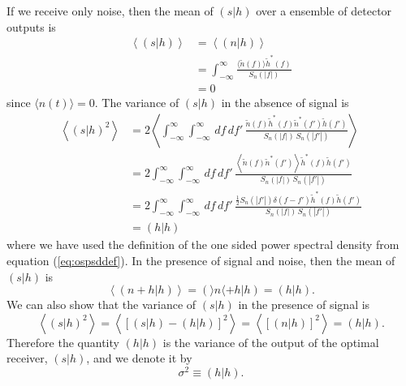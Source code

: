 If we receive only noise, then the mean of $(s|h)$ over a ensemble of detector
outputs is 
\begin{equation}
\begin{split}
\left\langle (s|h) \right\rangle &= \left\langle (n|h) \right\rangle \\
&= \int_{-\infty}^{\infty} 
   \frac{\langle\tilde{n}(f)\rangle \tilde{h}^\ast(f)}{S_n(|f|)} \\
&= 0
\end{split}
\end{equation}
since $\langle n(t) \rangle = 0$. The variance of $(s|h)$ in the absence of
signal is
\begin{equation}
\begin{split}
\left\langle(s|h)^2\right\rangle 
&= 2 \left\langle \int_{-\infty}^\infty \int_{-\infty}^\infty \,df\,df'\,
\frac{\tilde{n}(f)\tilde{h}^\ast(f) \tilde{n}^\ast(f')\tilde{h}(f')}
{S_n(|f|)\,S_n(|f'|)} \right\rangle \\
&= 2 \int_{-\infty}^\infty \int_{-\infty}^\infty \,df\,df'\,
\frac{\left\langle \tilde{n}(f)\tilde{n}^\ast(f')\right\rangle\tilde{h}^\ast(f)\tilde{h}(f')}
{S_n(|f|)\,S_n(|f'|)} \\
&= 2 \int_{-\infty}^\infty \int_{-\infty}^\infty \,df\,df'\,
\frac{\frac{1}{2}S_n(|f'|)\delta(f-f') \tilde{h}^\ast(f)\tilde{h}(f')}
{S_n(|f|)\,S_n(|f'|)} \\
&= (h|h)
\end{split}
\label{eq:filtervariance}
\end{equation}
where we have used the definition of the one sided power spectral density from
equation (\ref{eq:ospsddef}).  In the presence of signal and noise, then the
mean of $(s|h)$ is
\begin{equation}
\left\langle (n+h|h) \right\rangle = (\rangle n \langle + h|h) = (h|h).
\end{equation}
We can also show that the variance of $(s|h)$ in the presence of signal is
\begin{equation}
\left\langle (s|h)^2 \right\rangle 
= \left\langle \left[ (s|h) - (h|h) \right]^2 \right\rangle
= \left\langle \left[ (n|h) \right]^2 \right\rangle
= (h|h).
\end{equation}
Therefore the quantity $(h|h)$ is the variance of the output of the optimal
receiver, $(s|h)$, and we denote it by
\begin{equation}
\sigma^2 \equiv (h|h).
\label{eq:sigmasqdef}
\end{equation}

